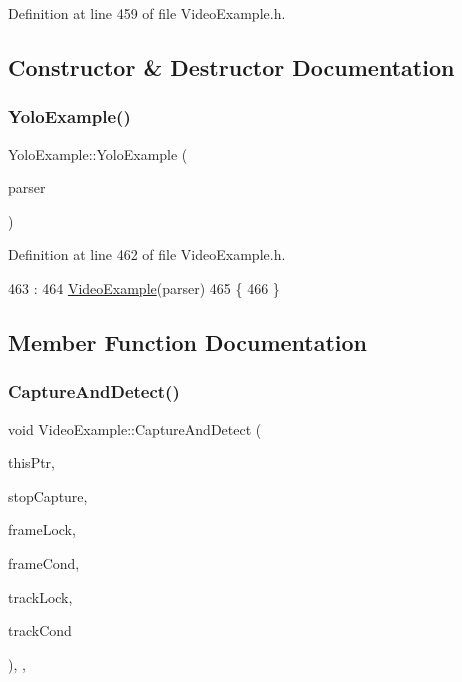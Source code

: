 Definition at line 459 of file Video\+Example.\+h.



\subsection{Constructor \& Destructor Documentation}
\mbox{\label{class_yolo_example_a367f6ec19a676918f05a78706d3d664d}} 
\subsubsection{\texorpdfstring{Yolo\+Example()}{YoloExample()}}
{\footnotesize\ttfamily Yolo\+Example\+::\+Yolo\+Example (\begin{DoxyParamCaption}\item[{const cv\+::\+Command\+Line\+Parser \&}]{parser }\end{DoxyParamCaption})\hspace{0.3cm}{\ttfamily [inline]}}



Definition at line 462 of file Video\+Example.\+h.


\begin{DoxyCode}
463         :
464           \mbox{\hyperlink{class_video_example_aedc40ab44835e8ad1cf731b7709cd4ac}{VideoExample}}(parser)
465     \{
466     \}
\end{DoxyCode}


\subsection{Member Function Documentation}
\mbox{\label{class_video_example_ace8617201da40b6e230bd6c049b48aa0}} 
\subsubsection{\texorpdfstring{Capture\+And\+Detect()}{CaptureAndDetect()}}
{\footnotesize\ttfamily void Video\+Example\+::\+Capture\+And\+Detect (\begin{DoxyParamCaption}\item[{\mbox{\hyperlink{class_video_example}{Video\+Example}} $\ast$}]{this\+Ptr,  }\item[{bool $\ast$}]{stop\+Capture,  }\item[{std\+::mutex $\ast$}]{frame\+Lock,  }\item[{std\+::condition\+\_\+variable $\ast$}]{frame\+Cond,  }\item[{std\+::mutex $\ast$}]{track\+Lock,  }\item[{std\+::condition\+\_\+variable $\ast$}]{track\+Cond }\end{DoxyParamCaption})\hspace{0.3cm}{\ttfamily [static]}, {\ttfamily [protected]}, {\ttfamily [inherited]}}



